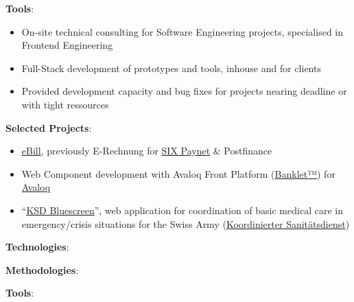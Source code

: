 \documentclass[10pt, a4paper,ragged2e]{altacv}
\begin{document}
\textbf{Tools}:

\divider


\begin{itemize}
	\item On-site technical consulting for Software Engineering projects, specialised in Frontend Engineering
	\item Full-Stack development of prototypes and tools, inhouse and for clients
	\item Provided development capacity and bug fixes for projects nearing deadline or with tight ressources
\end{itemize}

\textbf{Selected Projects}:
\begin{itemize}
	\item \href{https://www.ebill.ch/}{eBill}, previously E-Rechnung for \href{https://www.six-group.com/en/site/banking-services/paynet.html}{SIX Paynet} \& Postfinance
	\item Web Component development with Avaloq Front Platform (\href{https://developer.avaloq.com/web/developer-portal/learn}{Banklet™}) for \href{https://www.avaloq.com/en/}{Avaloq}
	\item \enquote{\href{https://blog.alertswiss.ch/de/rubriken/bevoelkerungsschutz/koordinierter-sanitaetsdienst-ksd-neues-management-tool-blue-screen-switzerland/}{KSD Bluescreen}}, web application for coordination of basic medical care in emergency/crisis situations for the Swiss Army (\href{https://www.vtg.admin.ch/de/organisation/astab/san/ksd.html}{Koordinierter Sanitätsdienst})
\end{itemize}

\textbf{Technologies}:

\textbf{Methodologies}:

\textbf{Tools}:
\end{document}
